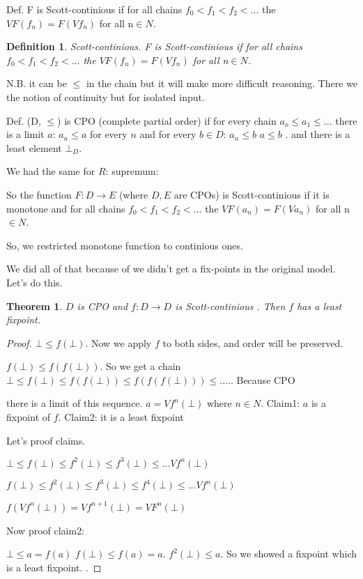\documentclass[a4paper,10pt]{book}
\newtheorem{theorem}{Theorem}
\newtheorem{definition}{Definition}
\newcommand{\rarr}{ \rightarrow }
\begin{document}
Def. F is Scott-continious if for all chains  $f_0 < f_1 < f_2 < ...$
the $V F(f_n) = F(Vf_n)$ for all n$\in N$.
\begin{definition}{Scott-continious.}
F is Scott-continious if for all chains  $f_0 < f_1 < f_2 < ...$
the $V F(f_n) = F(Vf_n)$ for all n$\in N$.
\end{definition}
N.B. it can be $\leq$ in the chain but it will make more difficult reasoning. There we
the notion of continuity but for isolated input.

Def. (D, $\leq$) is CPO (complete partial order) if for every chain $a_o \leq a_1 \leq ...$
there is a limit $a$: $a_n\leq a$ for every $n$ and for every $b\in D$: $a_n\leq b$ $a\leq b$ .
and there is a least element $\bot_D$.

We had the same for $R$: supremum:

So the function $F: D \rarr E$  (where $D,E$ are CPOs) is Scott-continious 
if it is monotone and for all chains  $f_0 < f_1 < f_2 < ...$
the $V F(a_n) = F(V a_n)$ for all n $\in N$.

So, we restricted monotone function to continious ones. 

We did all of that because of we didn't get a fix-points in the original model. Let's do this.


\begin{theorem}
$D$ is CPO and $f: D \rarr D$ is Scott-continious . Then $f$ has a least fixpoint.
\end{theorem}
\begin{proof}
$\bot \leq f(\bot)$. Now we apply $f$ to both sides, and order will be preserved.

$f(\bot) \leq  f(f(\bot))$. So we get a chain
$\bot \leq f(\bot) \leq f(f(\bot)) \leq f(f(f(\bot))) \leq ....$. Because CPO


there is a limit of this sequence. $a = Vf^n(\bot)$ where $n\in N$. 
Claim1: $a$ is a fixpoint of $f$.
Claim2: it is a least fixpoint

Let's proof claims.

$\bot \leq f(\bot) \leq f^2(\bot) \leq f^3(\bot) \leq ... Vf^n(\bot)$

$f(\bot) \leq f^2(\bot) \leq f^3(\bot) \leq f^4(\bot) \leq ... Vf^n(\bot)$

$f(Vf^n(\bot)) = Vf^{n+1}(\bot) = VF^n(\bot)$

Now proof claim2:
 
 $\bot \leq a = f(a)$
 $f(\bot) \leq f(a) = a$.
 $f^2(\bot) \leq a$.  So we showed a fixpoint which is a least fixpoint.
.
\end{proof}
\end{document}
